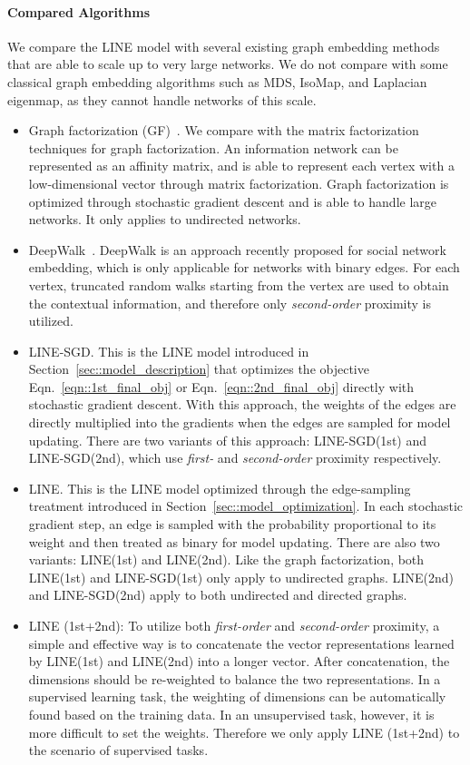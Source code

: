 \documentclass{sig-alternate-2013}
\begin{document}
\paragraph{Compared Algorithms}
We compare the LINE model with several existing graph embedding methods that are able to scale up to very large networks. We do not compare with some classical graph embedding algorithms such as MDS, IsoMap, and Laplacian eigenmap, as they cannot handle networks of this scale. 

\begin{itemize}
	\item Graph factorization (GF)~\cite{ahmed2013distributed}. We compare with the matrix factorization techniques for graph factorization. An information network can be represented as an affinity matrix, and is able to represent each vertex with a low-dimensional vector through matrix factorization. Graph factorization is optimized through stochastic gradient descent and is  able to handle large networks.  It only applies to undirected networks. 
	\item DeepWalk~\cite{perozzi2014deepwalk}. DeepWalk is an approach recently proposed for social network embedding, which is only applicable for networks with binary edges. For each vertex, truncated random walks starting from the vertex are used to obtain the contextual information, and therefore only \emph{second-order} proximity is utilized.
\item LINE-SGD. This is the LINE model introduced in Section~\ref{sec::model_description} that optimizes the objective Eqn.~\eqref{eqn::1st_final_obj} or Eqn.~\eqref{eqn::2nd_final_obj} directly with stochastic gradient descent. With this approach, the weights of the edges are directly multiplied into the gradients when the edges are sampled for model updating. There are two variants of this approach: LINE-SGD(1st) and LINE-SGD(2nd), which use \emph{first-} and \emph{second-order} proximity respectively.
	\item LINE. This is the LINE model optimized through the edge-sampling treatment introduced in Section~\ref{sec::model_optimization}. In each stochastic gradient step, an edge is sampled with the probability proportional to its weight and then treated as binary for model updating. There are also two variants: LINE(1st) and LINE(2nd). Like the graph factorization, both LINE(1st) and LINE-SGD(1st) only apply to undirected graphs. LINE(2nd) and LINE-SGD(2nd) apply to both undirected and directed graphs. 
	\item LINE (1st+2nd): To utilize both \emph{first-order} and \emph{second-order} proximity, a simple and effective way is to concatenate the vector representations learned by LINE(1st) and LINE(2nd) into a longer vector. After concatenation, the dimensions should be re-weighted to balance the two representations. In a supervised learning task, the weighting of dimensions can be automatically found based on the training data. In an unsupervised task, however, it is more difficult to set the weights. Therefore we only apply LINE (1st+2nd) to the scenario of supervised tasks. 
\end{itemize}
\end{document}
